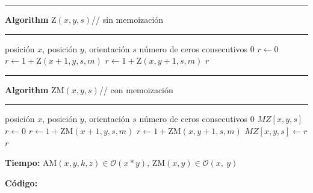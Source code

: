 \documentclass[a4paper, 12pt]{article}
\def\bigO{\mathcal{O}}
\begin{document}
\begin{minipage}[t]{78mm}
  \hrule{\bf Algorithm} Z$(x,y,s)$\hfill// sin memoización\hrule
  \begin{algorithmic}[1]
    \mInput posición $x$, posición $y$, orientación $s$
    \mOutput número de ceros consecutivos
    \Return $0$
    \EndIf
    \State $r \gets 0$
    \State $r \gets 1 + \text{Z}(x + 1, y, s, m)$
    \Else
    \State $r \gets 1 + \text{Z}(x, y + 1, s, m)$
    \EndIf
    \Return $r$
  \end{algorithmic}
\end{minipage}\hfill
\begin{minipage}[t]{78mm}
  \hrule{\bf Algorithm} ZM$(x,y,s)$\hfill// con memoización\hrule
  \begin{algorithmic}[1]
    \mInput posición $x$, posición $y$, orientación $s$
    \mOutput número de ceros consecutivos
    \Return $0$
    \EndIf
    \Return $MZ[x,y,s]$
    \EndIf
    \State $r \gets 0$
    \State $r \gets 1 + \text{ZM}(x + 1, y, s, m)$
    \Else
    \State $r \gets 1 + \text{ZM}(x, y + 1, s, m)$
    \EndIf
    \State $MZ[x,y,s] \gets r$
    \Return $r$
  \end{algorithmic}


\end{minipage}\hfill

\textbf{Tiempo:} AM$(x,y,k,z)\in \bigO(x*y)$, ZM$(x,y)\in \bigO(x,\ y)$

\textbf{Código:}\\
\end{document}
